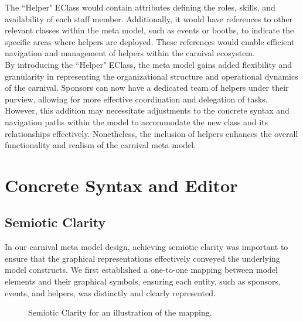 \documentclass[a4paper,11pt]{report}
\begin{document}
The ``Helper" EClass would contain attributes defining the roles, skills, and availability of each staff member. Additionally, it would have references to other relevant classes within the meta model, such as events or booths, to indicate the specific areas where helpers are deployed. These references would enable efficient navigation and management of helpers within the carnival ecosystem.\\

By introducing the ``Helper" EClass, the meta model gains added flexibility and granularity in representing the organizational structure and operational dynamics of the carnival. Sponsors can now have a dedicated team of helpers under their purview, allowing for more effective coordination and delegation of tasks. However, this addition may necessitate adjustments to the concrete syntax and navigation paths within the model to accommodate the new class and its relationships effectively. Nonetheless, the inclusion of helpers enhances the overall functionality and realism of the carnival meta model.
\section{Concrete Syntax and Editor}
\subsection{Semiotic Clarity}
In our carnival meta model design, achieving semiotic clarity was important to ensure that the graphical representations effectively conveyed the underlying model constructs. We first established a one-to-one mapping between model elements and their graphical symbols, ensuring each entity, such as sponsors, events, and helpers, was distinctly and clearly represented. 
\begin{figure}[h]
\begin{center}
\caption{{\footnotesize Semiotic Clarity for an illustration of the mapping.}}
\label{Fig2}
\end{center}
\end{figure}
\end{document}
